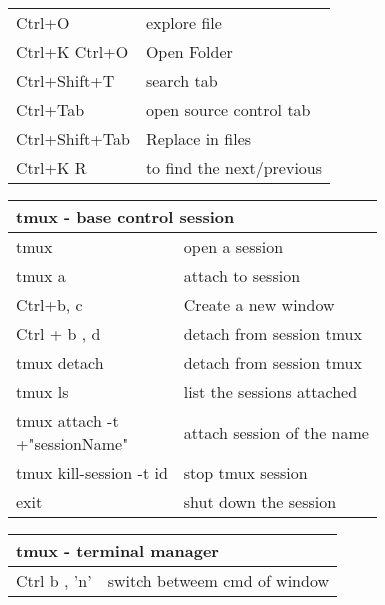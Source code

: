 \documentclass{article}
\begin{document}
\begin{landscape}
\begin{multicols*}{3}
\begin{tabular}{m{3cm}m{5cm}}
            \rowcolor{LightCyan}
            Ctrl+O         & explore file                            \\
            Ctrl+K Ctrl+O  & Open Folder                             \\
            \rowcolor{LightCyan}
            Ctrl+Shift+T   & search tab                              \\
            Ctrl+Tab       & open source control tab                 \\
            \rowcolor{LightCyan}
            Ctrl+Shift+Tab & Replace in files                        \\
            Ctrl+K R       & to find the next/previous
        \end{tabular}
        \vspace{5pt}
        \begin{tabular}{m{3cm}m{5cm}}
            \multicolumn{2}{l}{\textbf{tmux - base control session}  } \\
            \hline
            tmux                    & open a session                   \\
            \rowcolor{LightCyan}
            tmux a                  & attach to session                \\
            Ctrl+b, c               & Create a new window              \\
            \rowcolor{LightCyan}
            Ctrl + b , d            & detach from session tmux         \\
            tmux detach             & detach from session tmux         \\
            \rowcolor{LightCyan}
            tmux ls                 & list the sessions attached       \\
            \makecell{tmux attach -t                                   \\ +"sessionName"} & attach session of the name \\
            \rowcolor{LightCyan}
            tmux kill-session -t id & stop tmux session                \\
            exit                    & shut down the session
        \end{tabular}
        \vspace{5pt}
        \begin{tabular}{m{3cm}m{5cm}}
            \multicolumn{2}{l}{\textbf{tmux - terminal manager }  } \\
            \hline
            Ctrl b , 'n'    & switch betweem cmd of window          \\

\end{tabular}
\end{multicols*}
\end{landscape}
\end{document}
